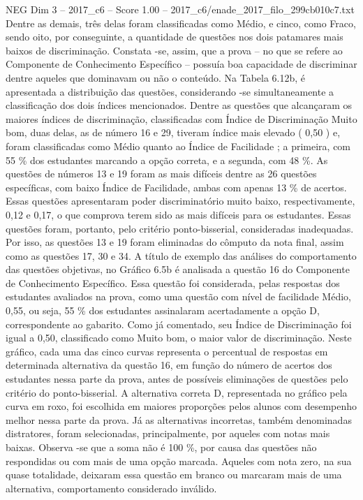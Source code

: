 \begin{textsample}{NEG Dim 3 – 2017\_c6 – Score 1.00 – 2017\_c6/enade\_2017\_filo\_299cb010c7.txt}
Dentre as demais, três delas foram classificadas como Médio, e cinco, como Fraco, sendo oito, por conseguinte, a quantidade de questões nos dois patamares mais baixos de discriminação.
Constata -se, assim, que a prova – no que se refere ao Componente de Conhecimento Específico – possuía boa capacidade de discriminar dentre aqueles que dominavam ou não o conteúdo.
Na Tabela 6.12b, é apresentada a distribuição das questões, considerando -se simultaneamente a classificação dos dois índices mencionados.
Dentre as questões que alcançaram os maiores índices de discriminação, classificadas com Índice de Discriminação Muito bom, duas delas, as de número 16 e 29, tiveram índice mais elevado ( 0,50 ) e, foram classificadas como Médio quanto ao Índice de Facilidade ; a primeira, com 55 \% dos estudantes marcando a opção correta, e a segunda, com 48 \%.
As questões de números 13 e 19 foram as mais difíceis dentre as 26 questões específicas, com baixo Índice de Facilidade, ambas com apenas 13 \% de acertos.
Essas questões apresentaram poder discriminatório muito baixo, respectivamente, 0,12 e 0,17, o que comprova terem sido as mais difíceis para os estudantes.
Essas questões foram, portanto, pelo critério ponto-bisserial, consideradas inadequadas.
Por isso, as questões 13 e 19 foram eliminadas do cômputo da nota final, assim como as questões 17, 30 e 34.
A título de exemplo das análises do comportamento das questões objetivas, no Gráfico 6.5b é analisada a questão 16 do Componente de Conhecimento Específico.
Essa questão foi considerada, pelas respostas dos estudantes avaliados na prova, como uma questão com nível de facilidade Médio, 0,55, ou seja, 55 \% dos estudantes assinalaram acertadamente a opção D, correspondente ao gabarito.
Como já comentado, seu Índice de Discriminação foi igual a 0,50, classificado como Muito bom, o maior valor de discriminação.
Neste gráfico, cada uma das cinco curvas representa o percentual de respostas em determinada alternativa da questão 16, em função do número de acertos dos estudantes nessa parte da prova, antes de possíveis eliminações de questões pelo critério do ponto-bisserial.
A alternativa correta D, representada no gráfico pela curva em roxo, foi escolhida em maiores proporções pelos alunos com desempenho melhor nessa parte da prova.
Já as alternativas incorretas, também denominadas distratores, foram selecionadas, principalmente, por aqueles com notas mais baixas.
Observa -se que a soma não é 100 \%, por causa das questões não respondidas ou com mais de uma opção marcada.
Aqueles com nota zero, na sua quase totalidade, deixaram essa questão em branco ou marcaram mais de uma alternativa, comportamento considerado inválido.

\end{textsample}
